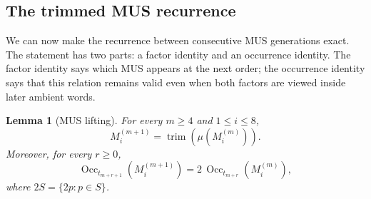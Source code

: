 \documentclass[10pt,a4paper]{article}
\newtheorem{lemma}[theorem]{Lemma}
\theoremstyle{definition}\newtheorem{definition}[theorem]{Definition}
\theoremstyle{remark}\newtheorem{remark}[theorem]{Remark}
\newcommand{\Occ}{\operatorname{Occ}}
\begin{document}
\subsection{The trimmed MUS recurrence}
\label{subsec:trimmed-lifting}

We can now make the recurrence between consecutive MUS generations exact. The statement has two parts: a factor identity and an occurrence identity. The factor identity says which MUS appears at the next order; the occurrence identity says that this relation remains valid even when both factors are viewed inside later ambient words.

\begin{lemma}[MUS lifting]
\label{lem:mus-lifting}
For every $m\ge4$ and $1\le i\le8$,
\begin{equation}
M_i^{(m+1)}=\operatorname{trim}\!\left(\mu(M_i^{(m)})\right).
\label{eq:mus-trim-recurrence}
\end{equation}
Moreover, for every $r\ge0$,
\begin{equation}
\Occ_{t_{m+r+1}}\!\left(M_i^{(m+1)}\right)
=2\,\Occ_{t_{m+r}}\!\left(M_i^{(m)}\right),
\label{eq:occ-doubling}
\end{equation}
where $2S=\{2p:p\in S\}$.
\end{lemma}
\end{document}
